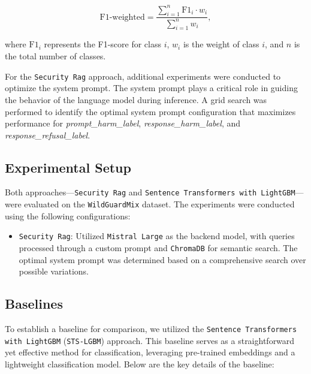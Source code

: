 \documentclass{article}
\begin{document}
\begin{equation}
\text{F1-weighted} = \frac{\sum_{i=1}^{n} \text{F1}_{i} \cdot w_{i}}{\sum_{i=1}^{n} w_{i}},
\end{equation}


where $\text{F1}_{i}$ represents the F1-score for class $i$, $w_{i}$ is the weight of class $i$, and $n$ is the total number of classes.

For the \texttt{Security Rag} approach, additional experiments were conducted to optimize the system prompt. The system prompt plays a critical role in guiding the behavior of the language model during inference. A grid search was performed to identify the optimal system prompt configuration that maximizes performance for \textit{prompt\_harm\_label}, \textit{response\_harm\_label}, and \textit{response\_refusal\_label}.

\subsection{Experimental Setup}

Both approaches—\texttt{Security Rag} and \texttt{Sentence Transformers with LightGBM}—were evaluated on the \texttt{WildGuardMix} dataset. The experiments were conducted using the following configurations:
\begin{itemize}
    \item \texttt{Security Rag}: Utilized \texttt{Mistral Large} as the backend model, with queries processed through a custom prompt and \texttt{ChromaDB} for semantic search. The optimal system prompt was determined based on a comprehensive search over possible variations.
\end{itemize}


\subsection{Baselines}

To establish a baseline for comparison, we utilized the \texttt{Sentence Transformers with LightGBM} (\texttt{STS-LGBM}) approach. This baseline serves as a straightforward yet effective method for classification, leveraging pre-trained embeddings and a lightweight classification model. Below are the key details of the baseline:
\end{document}
